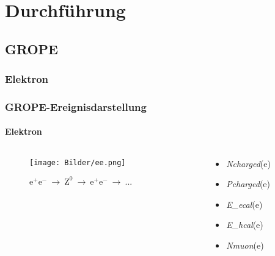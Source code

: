 \documentclass{beamer}
\begin{document}
\section{Durchführung}

\subsection{GROPE}
\subsubsection{Elektron}

\begin{frame}
	\frametitle{GROPE-Ereignisdarstellung}
	\framesubtitle{Elektron}
	
	\begin{columns}
		\begin{column}{0.6\textwidth}
		\begin{figure}[H]
			\centering
			\label{fig:GROPEee}
			\texttt{[image: Bilder/ee.png]}
			\caption{{\footnotesize $\mathrm{e}^+\mathrm{e}^- \ \longrightarrow\ \mathrm{Z}^0 \ \longrightarrow\ \mathrm{e}^+\mathrm{e}^-\ \longrightarrow\ ...$}}
		\end{figure}
		\end{column}
		\begin{column}{0.4\textwidth}
		
		\begin{itemize}
			\item {\color{blue}\textit{Ncharged}(e)}\newline
					\only<2>{$\in [2,3]$}
			\item {\color{blue}\textit{Pcharged}(e)}\newline
			
			\item {\color[rgb]{0.6,0.6,0}\textit{E\_ecal}(e)}\newline
					\only<2>{groß}
			\item {\color[rgb]{1,0,1}\textit{E\_hcal}(e)}\newline
			
			\item {\color{red}\textit{Nmuon}(e)}\newline
			
		\end{itemize}
		\end{column}
	\end{columns}
	
\end{frame}
\end{document}
